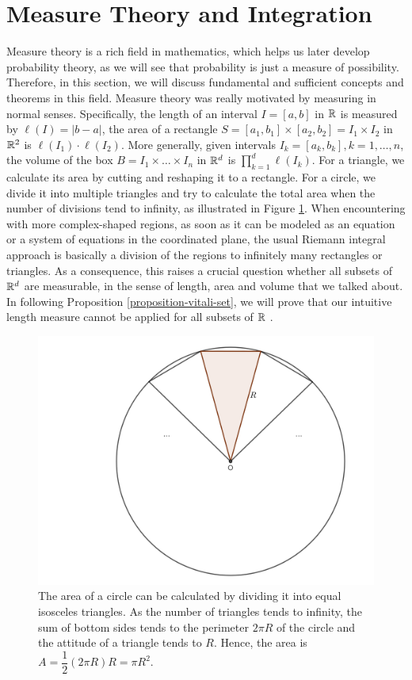 \section{Measure Theory and Integration}

Measure theory is a rich field in mathematics, which helps us later develop probability theory, as we will see that probability is just a measure of possibility. Therefore, in this section, we will discuss fundamental and sufficient concepts and theorems in this field. Measure theory was really motivated by measuring in normal senses. Specifically, the length of an interval $I=[a,b]$ in $\mathbb{R}$ is measured by $\ell(I)=|b-a|$, the area of a rectangle $S = [a_1,b_1]\times [a_2,b_2] = I_1\times I_2$ in $\mathbb{R}^2$ is $\ell(I_1)\cdot\ell(I_2)$. More generally, given intervals $I_k = [a_k,b_k], k = 1,\ldots, n$, the volume of the box $B= I_1\times \ldots \times I_n$ in  $\mathbb{R}^d$ is $\prod\limits_{k=1}^d \ell(I_k)$. For a triangle, we calculate its area by cutting and reshaping it to a rectangle. For a circle, we divide it into multiple triangles and try to calculate the total area when the number of divisions tend to infinity, as illustrated in Figure \ref{figure:circle}. When encountering with more complex-shaped regions, as soon as it can be modeled as an equation or a system of equations in the coordinated plane, the usual Riemann integral approach is basically a division of the regions to infinitely many rectangles or triangles. As a consequence, this raises a crucial question whether all subsets of $\mathbb{R}^d$ are measurable, in the sense of length, area and volume that we talked about. In following Proposition \ref{proposition-vitali-set}, we will prove that our intuitive length measure cannot be applied for all subsets of $\mathbb{R}$ \cite{vitali1905sul}.

\begin{figure}[ht]
  \centering
  \includegraphics[width=0.4\linewidth]{img/circle.png}
  \vspace{0.5cm}
  \caption[Circle area approximation]{The area of a circle can be calculated by dividing it into equal isosceles triangles. As the number of triangles tends to infinity, the sum of bottom sides tends to the perimeter $2\pi R$ of the circle and the attitude of a triangle tends to $R$. Hence, the area is $A=\dfrac{1}{2}(2\pi R)R=\pi R^2$.}
  \label{figure:circle}
\end{figure}

